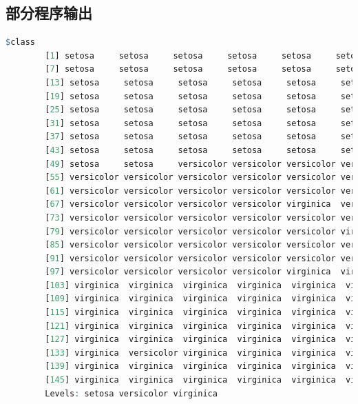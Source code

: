 \documentclass[12pt, a4paper, oneside]{ctexart}
\begin{document}
	\begin{appendices}
		\renewcommand{\thesection}{\Alph{section}}
		\section{部分程序输出}
	\begin{lstlisting}[language=R, caption={训练好的模型对鸢尾花数据集的预测结果}, label=predictIris]
		$class
		[1] setosa     setosa     setosa     setosa     setosa     setosa
		[7] setosa     setosa     setosa     setosa     setosa     setosa
		[13] setosa     setosa     setosa     setosa     setosa     setosa
		[19] setosa     setosa     setosa     setosa     setosa     setosa
		[25] setosa     setosa     setosa     setosa     setosa     setosa
		[31] setosa     setosa     setosa     setosa     setosa     setosa
		[37] setosa     setosa     setosa     setosa     setosa     setosa
		[43] setosa     setosa     setosa     setosa     setosa     setosa
		[49] setosa     setosa     versicolor versicolor versicolor versicolor
		[55] versicolor versicolor versicolor versicolor versicolor versicolor
		[61] versicolor versicolor versicolor versicolor versicolor versicolor
		[67] versicolor versicolor versicolor versicolor virginica  versicolor
		[73] versicolor versicolor versicolor versicolor versicolor versicolor
		[79] versicolor versicolor versicolor versicolor versicolor virginica
		[85] versicolor versicolor versicolor versicolor versicolor versicolor
		[91] versicolor versicolor versicolor versicolor versicolor versicolor
		[97] versicolor versicolor versicolor versicolor virginica  virginica
		[103] virginica  virginica  virginica  virginica  virginica  virginica
		[109] virginica  virginica  virginica  virginica  virginica  virginica
		[115] virginica  virginica  virginica  virginica  virginica  virginica
		[121] virginica  virginica  virginica  virginica  virginica  virginica
		[127] virginica  virginica  virginica  virginica  virginica  virginica
		[133] virginica  versicolor virginica  virginica  virginica  virginica
		[139] virginica  virginica  virginica  virginica  virginica  virginica
		[145] virginica  virginica  virginica  virginica  virginica  virginica
		Levels: setosa versicolor virginica
		

\end{lstlisting}
\end{appendices}
\end{document}
